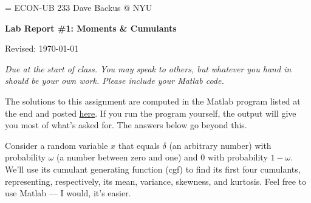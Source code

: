 \documentclass[11pt]{exam}
\begin{document}
\parskip=\bigskipamount
\parindent=0.0in
\thispagestyle{empty}
{\large ECON-UB 233 \hfill Dave Backus @ NYU}

\bigskip\bigskip
\centerline{\Large \bf Lab Report \#1: Moments \& Cumulants}
\centerline{Revised: \today}

\bigskip
{\it Due at the start of class.
You may speak to others, but whatever you hand in should be your own work.
Please include your Matlab code.}

\begin{questions}

\begin{solution}
The solutions to this assignment are computed in the Matlab
program listed at the end and posted
\href{http://pages.stern.nyu.edu/~dbackus/233/hw1_s13.m}{here}.
If you run the program yourself,
the output will give you most of what's asked for.
The answers below go beyond this.
\end{solution}

Consider a random variable $x$ that equals
$\delta$ (an arbitrary number) with probability $\omega$ (a number between zero and one)
and $0$ with probability $1-\omega$.
We'll use its cumulant generating function (cgf)
to find its first four cumulants, representing,
respectively, its mean, variance, skewness, and kurtosis.
Feel free to use Matlab --- I would, it's easier.
%
\end{questions}
\end{document}
